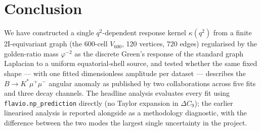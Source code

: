 \section{Conclusion}\label{sec:conclusion}

We have constructed a single $q^{2}$-dependent response kernel
$\kappa(q^{2})$ from a finite 2I-equivariant graph (the 600-cell
$V_{600}$, 120 vertices, 720 edges) regularised by the golden-ratio
mass $\varphi^{-2}$ as the discrete Green's response of the standard
graph Laplacian to a uniform equatorial-shell source, and tested
whether the same fixed shape — with one fitted dimensionless amplitude
per dataset — describes the $B\to K^{*}\mu^{+}\mu^{-}$ angular anomaly
as published by two collaborations across five fits and three decay
channels. The headline analysis evaluates every fit using
\texttt{flavio.np\_prediction} directly (no Taylor expansion in
$\Delta C_{9}$); the earlier linearised analysis is reported alongside
as a methodology diagnostic, with the difference between the two
modes the largest single uncertainty in the project.

